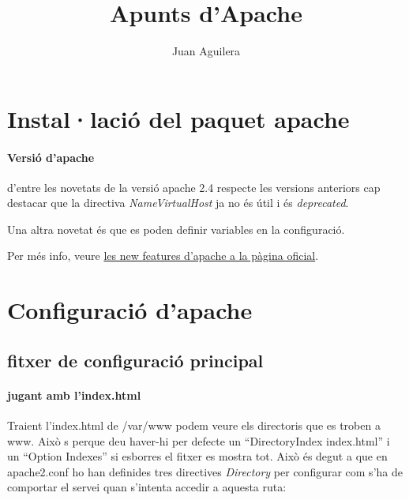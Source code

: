 \documentclass[a4paper, 11pt]{article}
\begin{document}
\title{Apunts d'Apache}
\author{Juan Aguilera}
\maketitle

\section{Instal·lació del paquet apache}
\paragraph{Versió d'apache \\}


d'entre les novetats de la versió apache 2.4 respecte les versions anteriors cap destacar que la directiva \textit{NameVirtualHost} ja no \'es útil i \'es \textit{deprecated}.

Una altra novetat \'es que es poden definir variables en la configuració.

Per m\'es info, veure \href{https://httpd.apache.org/docs/2.4/new_features_2_4.html}{les new features d'apache a la pàgina oficial}\cite{DOC}.

\section{Configuració d'apache}
\subsection{fitxer de configuració principal}
\paragraph{jugant amb l'index.html }
Traient l'index.html de /var/www podem veure els directoris que es troben a www. Això s perque deu haver-hi per defecte un “DirectoryIndex index.html” i un “Option Indexes” si esborres el fitxer es mostra tot. Això \'es degut a que en apache2.conf ho han definides tres directives \textit{Directory} per configurar com s'ha de comportar el servei quan s'intenta accedir a aquesta ruta:
\end{document}
